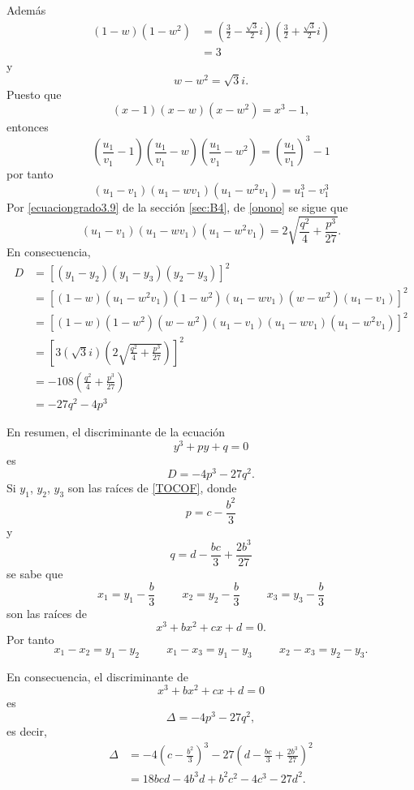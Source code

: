 Además
\begin{align*}
    (1-w)\left( 1-w^2 \right) &= \left( \frac{3}{2}-\frac{\sqrt{3}}{2} i \right) \left( \frac{3}{2}+\frac{\sqrt{3}}{2} i \right) \\
    &=3
\end{align*}
y
$$w-w^2=\sqrt{3}i.$$
Puesto que
$$(x-1)(x-w)\left( x-w^2 \right) =x^3-1,$$
entonces
$$\left( \frac{u_1}{v_1} -1 \right) \left( \frac{u_1}{v_1} -w \right) \left( \frac{u_1}{v_1}-w^2 \right) = \left( \frac{u_1}{v_1} \right)^3 -1$$
por tanto
\begin{equation}
    (u_1-v_1)(u_1-wv_1)\left( u_1-w^2v_1 \right) = u^3_1-v^3_1 \label{onono}
\end{equation}
Por \eqref{ecuaciongrado3.9} de la sección \ref{sec:B4}, de \eqref{onono} se sigue que
$$(u_1-v_1)(u_1-wv_1)\left( u_1-w^2v_1 \right) = 2 \sqrt{\frac{q^2}{4}+\frac{p^3}{27}}.$$
En consecuencia,
\begin{align*}
    D &=\left[ (y_1-y_2)(y_1-y_3)(y_2-y_3) \right]^2 \\
    &=\left[ (1-w)\left( u_1-w^2v_1 \right) \left( 1-w^2 \right) (u_1-wv_1) \left( w-w^2 \right) (u_1-v_1) \right]^2 \\
    &=\left[ (1-w) \left( 1-w^2 \right) \left( w-w^2 \right) (u_1-v_1) (u_1-wv_1) \left( u_1-w^2v_1 \right) \right]^2 \\
    &=\left[ 3 \left( \sqrt{3}i \right) \left( 2 \sqrt{\frac{q^2}{4}+\frac{p^3}{27}} \right) \right]^2 \\
    &= -108 \left( \frac{q^2}{4} + \frac{p^3}{27} \right) \\
    &=-27q^2-4p^3
\end{align*}

En resumen, el discriminante de la ecuación
\begin{equation}
    y^3+py+q=0 \label{TOCOF}
\end{equation}
es
$$D=-4p^3-27q^2.$$
Si $y_1$, $y_2$, $y_3$ son las raíces de \eqref{TOCOF}, donde
$$p=c-\frac{b^2}{3}$$
y
$$q=d-\frac{bc}{3}+\frac{2b^3}{27}$$
se sabe que
$$x_1 = y_1-\frac{b}{3} \hspace{1cm} x_2 = y_2-\frac{b}{3} \hspace{1cm} x_3 = y_3-\frac{b}{3}$$
son las raíces de
$$x^3+bx^2+cx+d=0.$$
Por tanto
$$x_1-x_2=y_1-y_2 \hspace{1cm} x_1-x_3=y_1-y_3 \hspace{1cm} x_2-x_3=y_2-y_3.$$

En consecuencia, el discriminante de
$$x^3+bx^2+cx+d=0$$
es
$$\Delta =-4p^3-27q^2,$$
es decir,
\begin{align*}
    \Delta & = -4 \left( c - \frac{b^2}{3} \right)^3 - 27 \left( d - \frac{bc}{3} + \frac{2b^3}{27} \right)^2 \\
    & =18bcd-4b^3d+b^2c^2-4c^3-27d^2.
\end{align*}

